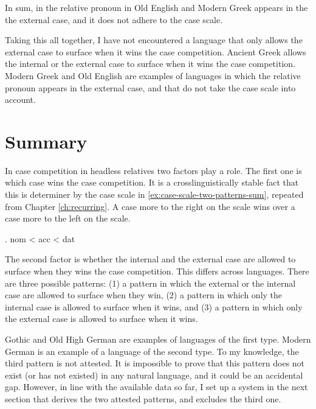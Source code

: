 In sum, in the relative pronoun in Old English and Modern Greek appears in the the external case, and it does not adhere to the case scale.

Taking this all together, I have not encountered a language that only allows the external case to surface when it wins the case competition. Ancient Greek allows the internal or the external case to surface when it wins the case competition. Modern Greek and Old English are examples of languages in which the relative pronoun appears in the external case, and that do not take the case scale into account.


\section{Summary}

In case competition in headless relatives two factors play a role. The first one is which case wins the case competition. It is a crosslinguistically stable fact that this is determiner by the case scale in \ref{ex:case-scale-two-patterns-sum}, repeated from Chapter \ref{ch:recurring}. A case more to the right on the scale wins over a case more to the left on the scale.

\ex. \ac{nom} < \ac{acc} < \ac{dat}\label{ex:case-scale-two-patterns-sum}

The second factor is whether the internal and the external case are allowed to surface when they wins the case competition. This differs across languages. There are three possible patterns: (1) a pattern in which the external or the internal case are allowed to surface when they win, (2) a pattern in which only the internal case is allowed to surface when it wins, and (3) a pattern in which only the external case is allowed to surface when it wins.

Gothic and Old High German are examples of languages of the first type. Modern German is an example of a language of the second type. To my knowledge, the third pattern is not attested. It is impossible to prove that this pattern does not exist (or has not existed) in any natural language, and it could be an accidental gap. However, in line with the available data so far, I set up a system in the next section that derives the two attested patterns, and excludes the third one.
